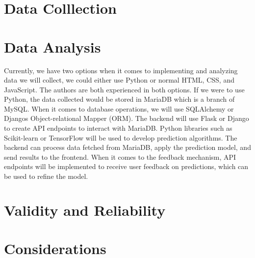 \section{Data Colllection}

\section{Data Analysis}
Currently, we have two options when it comes to implementing and analyzing data we will collect, we could either use Python or normal HTML, CSS, and JavaScript. The authors are both experienced in both options. 
If we were to use Python, the data collected would be stored in MariaDB which is a branch of MySQL. When it comes to database operations, we will use SQLAlchemy or Djangos Object-relational Mapper (ORM). The backend will use Flask or Django to create API endpoints to interact with MariaDB.
Python libraries such as Scikit-learn or TensorFlow will be used to develop prediction algorithms. The backend can process data fetched from MariaDB, apply the prediction model, and send results to the frontend.
When it comes to the feedback mechanism, API endpoints will be implemented to receive user feedback on predictions, which can be used to refine the model.



\section{Validity and Reliability}

\section{Considerations}
